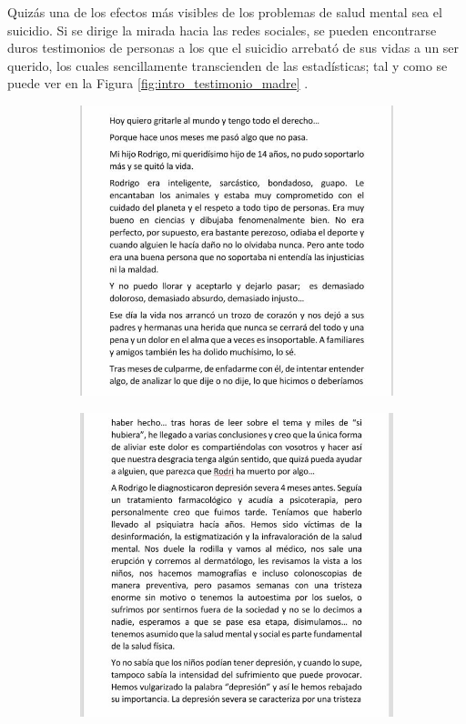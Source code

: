     Quizás una de los efectos más visibles de los problemas de salud mental sea el suicidio. Si se dirige la mirada hacia las redes sociales, se pueden encontrarse duros testimonios de personas a los que el suicidio arrebató de sus vidas a un ser querido, los cuales sencillamente transcienden de las estadísticas; tal y como se puede ver en la Figura \ref{fig:intro_testimonio_madre} .
    
    \begin{figure}[h]
        \begin{subfigure}[b]{0.49\textwidth}
            \includegraphics[width=1\linewidth]{figures/testimonio_madre_1.jpg}
        \end{subfigure}
        \hfill
        \begin{subfigure}[b]{0.49\textwidth}
            \includegraphics[width=1\linewidth]{figures/testimonio_madre_2.jpg}

\end{subfigure}
\end{figure}

